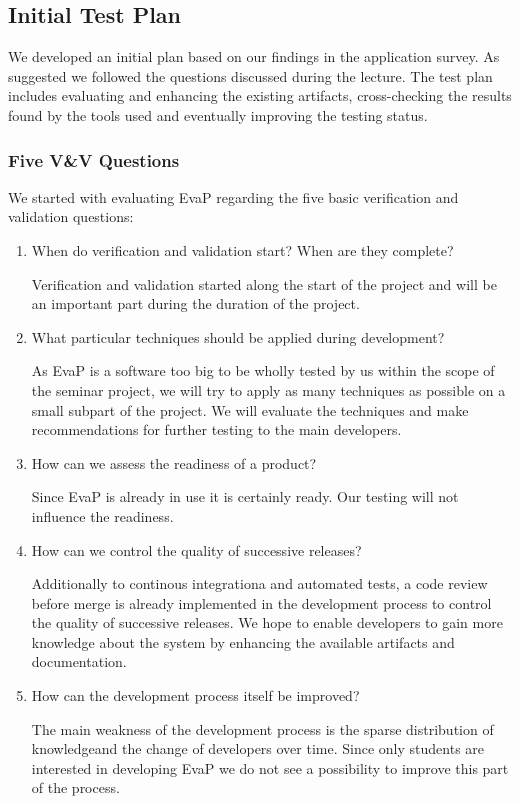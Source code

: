 \subsection{Initial Test Plan}
We developed an initial plan based on our findings in the application survey.
As suggested we followed the questions discussed during the lecture.
The test plan includes evaluating and enhancing the existing artifacts, cross-checking the results found by the tools used and eventually improving the testing status.

\subsubsection{Five V\&V Questions}
We started with evaluating EvaP regarding the five basic verification and validation questions:
\begin{enumerate}
	\item When do verification and validation start? When are they complete?
    
    Verification and validation started along the start of the project and will be an important part during the duration of the project. 
	\item What particular techniques should be applied during development?
    
    As EvaP is a software too big to be wholly tested by us within the scope of the seminar project, we will try to apply as many techniques as possible on a small subpart of the project. We will evaluate the techniques and make recommendations for further testing to the main developers.
	\item How can we assess the readiness of a product?
    
    Since EvaP is already in use it is certainly ready. Our testing will not influence the readiness.
	\item How can we control the quality of successive releases?
    
    Additionally to continous integrationa and automated tests, a code review before merge is already implemented in the development process to control the quality of successive releases. We hope to enable developers to gain more knowledge about the system by enhancing the available artifacts and documentation.
	\item How can the development process itself be improved?
    
    The main weakness of the development process is the sparse distribution of knowledgeand the change of developers over time. Since only students are interested in developing EvaP we do not see a possibility to improve this part of the process.
\end{enumerate}

